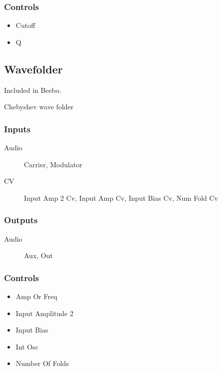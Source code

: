 \subsubsection{Controls}
\begin{itemize}
\item Cutoff
\item Q
\end{itemize}

\subsection{Wavefolder}

Included in Beebo.

Chebyshev wave folder



\subsubsection{Inputs}
\begin{description}
\item [Audio] Carrier, Modulator
\item [CV] Input Amp 2 Cv, Input Amp Cv, Input Bias Cv, Num Fold Cv
\end{description}

\subsubsection{Outputs}
\begin{description}
\item [Audio] Aux, Out
\end{description}

\subsubsection{Controls}
\begin{itemize}
\item Amp Or Freq
\item Input Amplitude 2
\item Input Bias
\item Int Osc
\item Number Of Folds
\end{itemize}

